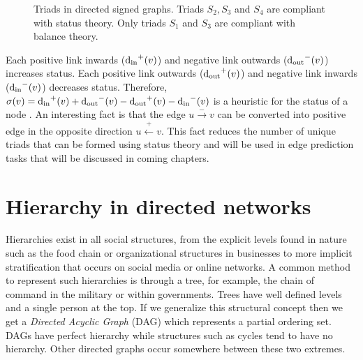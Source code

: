 \begin{figure}[!ht] 
    \centering
    
    \caption{Triads in directed signed graphs. Triads $S_2,S_3$ and $S_4$ are compliant with status theory. Only triads $S_1$ and $S_3$ are compliant with balance theory.}
    \label{fig:status-triads}
\end{figure}

Each positive link inwards ($\operatorname*{d_{\text{in}}}^{+}(v)$) and negative link outwards ($\operatorname*{d_{\text{out}}}^{-}(v)$) increases status. Each positive link outwards ($\operatorname*{d_{\text{out}}}^{+}(v)$) and negative link inwards ($\operatorname*{d_{\text{in}}}^{-}(v)$) decreases status. Therefore, $\sigma(v) = \operatorname*{d_{\text{in}}}^{+}(v) + \operatorname*{d_{\text{out}}}^{-}(v) - \operatorname*{d_{\text{out}}}^{+}(v)- \operatorname*{d_{\text{in}}}^{-}(v)$ is a heuristic for the status of a node \cite{leskovec2010predicting}. An interesting fact is that the edge $u \xrightarrow{-} v$ can be converted into positive edge in the opposite direction $u \xleftarrow{+} v$. This fact reduces the number of unique triads that can be formed using status theory and will be used in edge prediction tasks that will be discussed in coming chapters.

\section{Hierarchy in directed networks}
\label{sec:hierarchy}
Hierarchies exist in all social structures, from the explicit levels found in nature such as the food chain or organizational structures in businesses to more implicit stratification that occurs on social media or online networks. A common method to represent such hierarchies is through a tree, for example, the chain of command in the military or within governments. Trees have well defined levels and a single person at the top. If we generalize this structural concept then we get a \textit{Directed Acyclic Graph} (DAG) which represents a partial ordering set. DAGs have perfect hierarchy while structures such as cycles tend to have no hierarchy. Other directed graphs occur somewhere between these two extremes.

